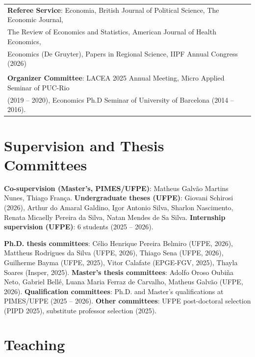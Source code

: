 \documentclass[a4paper,9pt]{article}
\begin{document}
\begin{flushleft}
\begin{tabular}{l}
\textbf{Referee Service}: Economia, British Journal of Political Science, The Economic Journal, \\
The Review of Economics and Statistics, American Journal of Health Economics, \\
Economics (De Gruyter), Papers in Regional Science, IIPF Annual Congress (2026) \\
\\
\textbf{Organizer Committee}: LACEA 2025 Annual Meeting, Micro Applied Seminar of PUC-Rio \\
(2019 -- 2020), Economics Ph.D Seminar of University of Barcelona (2014 -- 2016). \\
\end{tabular}
\end{flushleft}

\section{Supervision and Thesis Committees}

\noindent \textbf{Co-supervision (Master's, PIMES/UFPE)}: Matheus Galvão Martins Nunes, Thiago França. \textbf{Undergraduate theses (UFPE)}: Giovani Schirosi (2026), Arthur do Amaral Galdino, Igor Antonio Silva, Sharlon Nascimento, Renata Micaelly Pereira da Silva, Natan Mendes de Sa Silva. \textbf{Internship supervision (UFPE)}: 6 students (2025 -- 2026).

\vspace{1mm}

\noindent \textbf{Ph.D. thesis committees}: Célio Henrique Pereira Belmiro (UFPE, 2026), Mattheus Rodrigues da Silva (UFPE, 2026), Thiago Sena (UFPE, 2026), Guilherme Bayma (UFPE, 2025), Vitor Calafate (EPGE-FGV, 2025), Thayla Soares (Insper, 2025). \textbf{Master's thesis committees}: Adolfo Oroso Oubiña Neto, Gabriel Bellé, Luana Maria Ferraz de Carvalho, Matheus Galvão (UFPE, 2026). \textbf{Qualification committees}: Ph.D. and Master's qualifications at PIMES/UFPE (2025 -- 2026). \textbf{Other committees}: UFPE post-doctoral selection (PIPD 2025), substitute professor selection (2025).

\section{Teaching}
\end{document}
